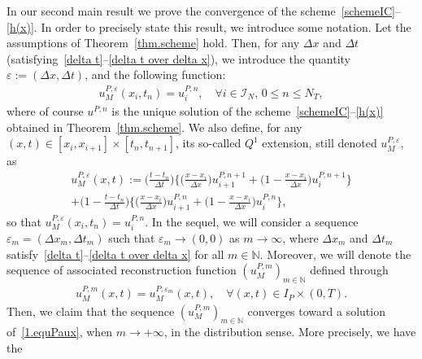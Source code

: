 \documentclass[11pt]{amsart}
\newcommand{\I}{\mathcal{I}_N}
\newcommand{\N}{\mathbb{N}}
\newcommand{\eps}{\varepsilon}
\begin{document}
In our second main result we prove the convergence of the scheme~\eqref{schemeIC}--\eqref{h(x)}. In order to precisely state this result, we introduce some notation. Let the assumptions of Theorem~\ref{thm.scheme} hold. Then, for any $\Delta x$ and $\Delta t$ (satisfying~\eqref{delta t}--\eqref{delta t over delta x}), we introduce the quantity $\eps := (\Delta x,\Delta t)$, and the following function:
\begin{align*}
    u^{P,\eps}_M(x_i,t_n) = u^{P,n}_i, \quad \forall i \in \I, \, 0\leq n \leq N_T,
\end{align*}
where of course $u^{P,n}$ is the unique solution of the scheme~\eqref{schemeIC}--\eqref{h(x)} obtained in Theorem~\ref{thm.scheme}. We also define, for any $(x, t) \in [x_i, x_{i + 1}] \times [t_n, t_{n+1}]$, its so-called $Q^1$ extension, still denoted $u^{P,\eps}_M$, as 
\begin{multline}\label{defQ1ext}
    u^{P, \eps}_M (x,t) := \bigg(\frac{t - t_n}{\Delta t}\bigg) \bigg\{\bigg(\frac{x - x_i}{\Delta x}\bigg) u_{i + 1} ^{P, n + 1} + \bigg(1 - \frac{x - x_i}{\Delta x}\bigg) u_i^{P, n + 1} \bigg\} \\ +\bigg(1 - \frac{t - t_n}{\Delta t}\bigg)\bigg\{\bigg(\frac{x - x_i}{\Delta x}\bigg) u_{i + 1}^{P, n} + \bigg(1 - \frac{x - x_i}{\Delta x}\bigg) u_i^{P, n }\bigg\},
\end{multline}
so that $u^{P,\eps}_M(x_i,t_n)=u^{P,n}_i$. In the sequel, we will consider a sequence $\eps_m=(\Delta x_m, \Delta t_m)$ such that $\eps_m \to (0,0)$ as $m \to \infty$, where $\Delta x_m$ and $\Delta t_m$ satisfy~\eqref{delta t}--\eqref{delta t over delta x} for all $m \in \mathbb{N}$. Moreover, we will denote the sequence of associated reconstruction function $(u^{P,m}_M)_{m\in\N}$ defined through
\begin{align*}
    u^{P,m}_M(x,t) = u^{P, \eps_m}_M(x,t), \quad \forall (x,t) \in I_P \times (0,T).
\end{align*}
Then, we claim that the sequence $(u^{P,m}_M)_{m \in \mathbb{N}}$ converges toward a solution of~\eqref{1.equPaux}, when $m\to+\infty$, in the distribution sense. More precisely, we have the
\end{document}
